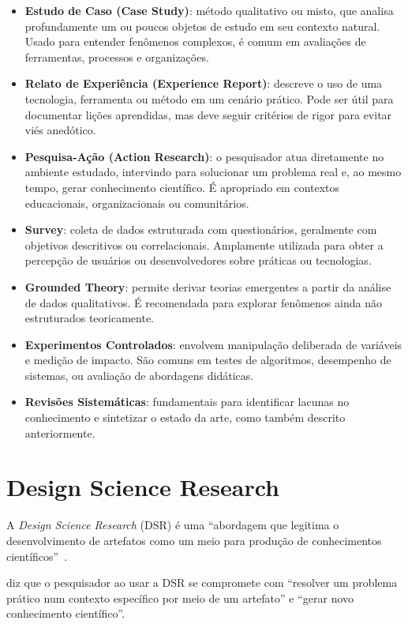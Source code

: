 \begin{itemize}
\item \textbf{Estudo de Caso (Case Study)}: método qualitativo ou misto, que analisa profundamente um ou poucos objetos de estudo em seu contexto natural. Usado para entender fenômenos complexos, é comum em avaliações de ferramentas, processos e organizações.
\item \textbf{Relato de Experiência (Experience Report)}: descreve o uso de uma tecnologia, ferramenta ou método em um cenário prático. Pode ser útil para documentar lições aprendidas, mas deve seguir critérios de rigor para evitar viés anedótico.
\item \textbf{Pesquisa-Ação (Action Research)}: o pesquisador atua diretamente no ambiente estudado, intervindo para solucionar um problema real e, ao mesmo tempo, gerar conhecimento científico. É apropriado em contextos educacionais, organizacionais ou comunitários.
\item \textbf{Survey}: coleta de dados estruturada com questionários, geralmente com objetivos descritivos ou correlacionais. Amplamente utilizada para obter a percepção de usuários ou desenvolvedores sobre práticas ou tecnologias.
\item \textbf{Grounded Theory}: permite derivar teorias emergentes a partir da análise de dados qualitativos. É recomendada para explorar fenômenos ainda não estruturados teoricamente.
\item \textbf{Experimentos Controlados}: envolvem manipulação deliberada de variáveis e medição de impacto. São comuns em testes de algoritmos, desempenho de sistemas, ou avaliação de abordagens didáticas.
\item \textbf{Revisões Sistemáticas}: fundamentais para identificar lacunas no conhecimento e sintetizar o estado da arte, como também descrito anteriormente.
\end{itemize}

\section{Design Science Research}

A \textit{Design Science Research} (DSR) é uma ``abordagem que legitima o desenvolvimento de artefatos como um meio para produção de conhecimentos científicos''~\citep{Pimentel2019}. 

\citet{Pimentel2019} diz que o pesquisador ao usar a DSR se compromete com ``resolver um problema prático num contexto específico por meio de um artefato'' e ``gerar novo conhecimento científico''.

